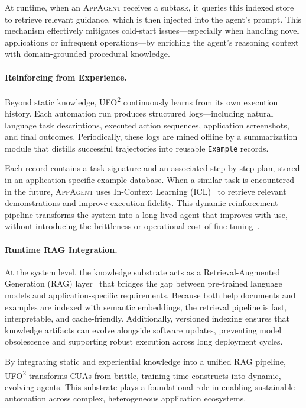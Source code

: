 \documentclass[sigplan,10pt]{acmart}
\newcommand{\name}{\textsc{UFO}\textsuperscript{2}\xspace}
\newcommand{\appa}{\textsc{AppAgent}\xspace}
\begin{document}
At runtime, when an \appa receives a subtask, it queries this indexed store to retrieve relevant guidance, which is then injected into the agent's prompt. This mechanism effectively mitigates cold-start issues—especially when handling novel applications or infrequent operations—by enriching the agent's reasoning context with domain-grounded procedural knowledge.

\paragraph{Reinforcing from Experience.}
Beyond static knowledge, \name continuously learns from its own execution history. Each automation run produces structured logs—including natural language task descriptions, executed action sequences, application screenshots, and final outcomes. Periodically, these logs are mined offline by a summarization module that distills successful trajectories into reusable \texttt{Example} records.

Each record contains a task signature and an associated step-by-step plan, stored in an application-specific example database. When a similar task is encountered in the future, \appa uses In-Context Learning (ICL)~\cite{dong2024survey, min2022rethinking, zhang2024allhands, luocontext} to retrieve relevant demonstrations and improve execution fidelity. This dynamic reinforcement pipeline transforms the system into a long-lived agent that improves with use, without introducing the brittleness or operational cost of fine-tuning~\cite{wang2025benchmark}.

\paragraph{Runtime RAG Integration.}
At the system level, the knowledge substrate acts as a Retrieval-Augmented Generation (RAG) layer~\cite{lewis2020retrieval, liu2024large, gao2023retrieval, jiang2024xpert} that bridges the gap between pre-trained language models and application-specific requirements. Because both help documents and examples are indexed with semantic embeddings, the retrieval pipeline is fast, interpretable, and cache-friendly. Additionally, versioned indexing ensures that knowledge artifacts can evolve alongside software updates, preventing model obsolescence and supporting robust execution across long deployment cycles.

By integrating static and experiential knowledge into a unified RAG pipeline, \name transforms CUAs from brittle, training-time constructs into dynamic, evolving agents. This substrate plays a foundational role in enabling sustainable automation across complex, heterogeneous application ecosystems.
\end{document}
